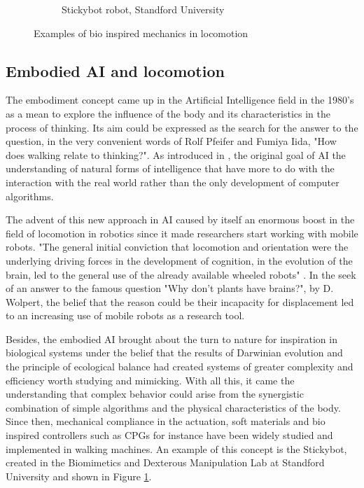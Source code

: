 \begin{figure}[h]
\begin{subfigure}[b]{0.45\textwidth}
        \caption{Stickybot robot, Standford University}
        \label{fig:stickybot}
    \end{subfigure}
\caption{Examples of bio inspired mechanics in locomotion}
\label{fig:figure1}
\end{figure}

\subsection{Embodied AI and locomotion} %
\label{sub:the_embodiment_}
The embodiment concept came up in the Artificial Intelligence field in the 1980's as a mean to explore the influence of the body and its characteristics in the process of thinking. 
Its aim could be expressed as the search for the answer to the question, in the very convenient words of Rolf Pfeifer and Fumiya Iida, "How does walking relate to thinking?".
As introduced in \cite{pfeifer}, the original goal of AI the understanding of natural forms of intelligence that have more to do with the interaction with the real world rather than the only development of computer algorithms.

The advent of this new approach in AI caused by itself an enormous boost in the field of locomotion in robotics since it made researchers start working with mobile robots.
"The general initial conviction that locomotion and orientation were the underlying driving forces in the development of cognition, in the evolution of the brain, led to the general use of the already available wheeled robots" \cite{pfeifer}.
In the seek of an answer to the famous question "Why don’t plants have brains?", by D. Wolpert, the belief that the reason could be their incapacity for displacement led to an increasing use of mobile robots as a research tool.

Besides, the embodied AI brought about the turn to nature for inspiration in biological systems under the belief that the results of Darwinian evolution and the principle of ecological balance had created systems of greater complexity and efficiency worth studying and mimicking.
With all this, it came the understanding that complex behavior could arise from the synergistic combination of simple algorithms and the physical characteristics of the body.
Since then, mechanical compliance in the actuation, soft materials and bio inspired controllers such as CPGs for instance have been widely studied and implemented in walking machines. 
An example of this concept is the Stickybot, created in the Biomimetics and Dexterous Manipulation Lab at Standford University and shown in Figure \ref{fig:stickybot}.

